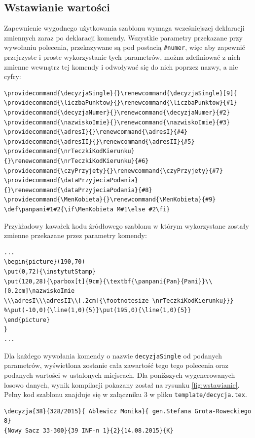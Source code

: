 \subsection{Wstawianie wartości}

Zapewnienie wygodnego użytkowania szablonu wymaga wcześniejszej deklaracji zmiennych zaraz po deklaracji komendy. Wszystkie parametry przekazane przy wywołaniu polecenia, przekazywane są pod postacią \texttt{\#numer}, więc aby zapewnić przejrzyste i proste wykorzystanie tych parametrów, można zdefiniować z nich zmienne wewnątrz tej komendy i odwoływać się do nich poprzez nazwy, a nie cyfry:

 \begin{lstlisting}
\providecommand{\decyzjaSingle}{}\renewcommand{\decyzjaSingle}[9]{
\providecommand{\liczbaPunktow}{}\renewcommand{\liczbaPunktow}{#1}
\providecommand{\decyzjaNumer}{}\renewcommand{\decyzjaNumer}{#2}
\providecommand{\nazwiskoImie}{}\renewcommand{\nazwiskoImie}{#3}
\providecommand{\adresI}{}\renewcommand{\adresI}{#4}
\providecommand{\adresII}{}\renewcommand{\adresII}{#5}
\providecommand{\nrTeczkiKodKierunku}{}\renewcommand{\nrTeczkiKodKierunku}{#6}
\providecommand{\czyPrzyjety}{}\renewcommand{\czyPrzyjety}{#7}
\providecommand{\dataPrzyjeciaPodania}{}\renewcommand{\dataPrzyjeciaPodania}{#8}
\providecommand{\MenKobieta}{}\renewcommand{\MenKobieta}{#9}
\def\panpani#1#2{\if\MenKobieta M#1\else #2\fi}
 \end{lstlisting}
 
Przykładowy kawałek kodu źródłowego szablonu w którym wykorzystane zostały zmienne przekazane przez parametry komendy:
 \begin{lstlisting}
...
\begin{picture}(190,70)
\put(0,72){\instytutStamp}
\put(120,28){\parbox[t]{9cm}{\textbf{\panpani{Pan}{Pani}}\\[0.2cm]\nazwiskoImie
\\\adresI\\\adresII\\[.2cm]{\footnotesize \nrTeczkiKodKierunku}}}
%\put(-10,0){\line(1,0){5}}\put(195,0){\line(1,0){5}}
\end{picture}
}
...
 \end{lstlisting}

Dla  każdego wywołania komendy o nazwie \texttt{decyzjaSingle} od podanych parametrów, wyświetlona zostanie cała zawartość tego tego polecenia oraz podanych wartości w ustalonych miejscach. Dla poniższych wygenerowanych losowo danych, wynik kompilacji pokazany został na rysunku \ref{fig:wstawianie}. Pełny kod szablonu znajduje się w załączniku 3 w pliku \texttt{template/decycja.tex}.
 \begin{lstlisting}
\decyzja{38}{328/2015}{ Ablewicz Monika}{ gen.Stefana Grota-Roweckiego 8}
{Nowy Sacz 33-300}{39 INF-n 1}{2}{14.08.2015}{K}
 \end{lstlisting}
 
